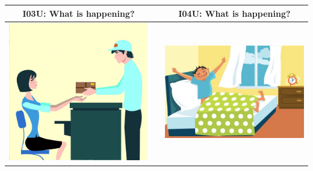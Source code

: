 \documentclass[12pt,notitlepage]{article}
\begin{document}
\begin{center}
\begin{tabular}{|c|c|c|}
\hline
I03U: What is happening? && I04U: What is happening? \\
\hline
\includegraphics[width=20em,trim=0 0 0 -3]{figures/I03.jpg} & & \includegraphics[width=20em,trim=0 0 0 -3]{figures/I04.jpg} \\
\hline
\end{tabular}
\vspace{1em} \\



\end{center}
\end{document}
